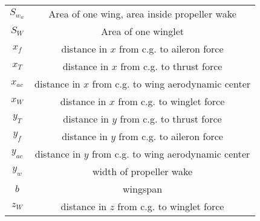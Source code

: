 \begin{center}
\begin{tabular}{| c | c |}
    $S_{w_w}$ & Area of one wing, area inside propeller wake \\
    $S_W$   & Area of one winglet \\
    $x_f$   & distance in $x$ from c.g. to aileron force \\
    $x_T$   & distance in $x$ from c.g. to thrust force \\
    $x_{ac}$& distance in $x$ from c.g. to wing aerodynamic center \\
    $x_W$   & distance in $x$ from c.g. to winglet force \\
    $y_T$   & distance in $y$ from c.g. to thrust force \\
    $y_f$   & distance in $y$ from c.g. to aileron force \\
    $y_{ac}$& distance in $y$ from c.g. to wing aerodynamic center \\
    $y_w$   & width of propeller wake \\ 
    $b$     & wingspan \\
    $z_W$   & distance in $z$ from c.g. to winglet force
\end{tabular} \end{center}